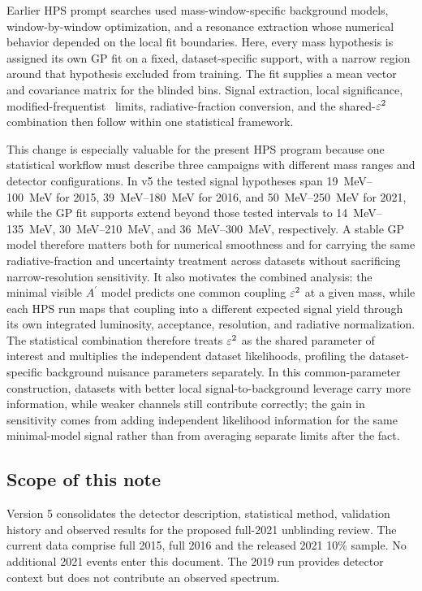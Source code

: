 Earlier HPS prompt searches used mass-window-specific background models,
window-by-window optimization, and a resonance extraction whose numerical behavior
depended on the local fit boundaries. Here, every mass hypothesis is assigned its own
GP fit on a fixed, dataset-specific support, with a narrow region around that hypothesis
excluded from training. The fit supplies a mean vector and covariance matrix for the
blinded bins. Signal extraction, local significance, modified-frequentist \CLs\ limits,
radiative-fraction conversion, and the shared-$\varepsilon^2$ combination then follow within
one statistical framework.

This change is especially valuable for the present HPS program because one statistical
workflow must describe three campaigns with different mass ranges and detector
configurations. In v5 the tested signal hypotheses span \SIrange{19}{100}{MeV} for
2015, \SIrange{39}{180}{MeV} for 2016, and \SIrange{50}{250}{MeV} for 2021, while
the GP fit supports extend beyond those tested intervals to
\SIrange{14}{135}{MeV}, \SIrange{30}{210}{MeV}, and
\SIrange{36}{300}{MeV}, respectively. A stable GP model therefore matters both for
numerical smoothness and for carrying the same radiative-fraction and uncertainty
treatment across datasets without sacrificing narrow-resolution sensitivity. It also
motivates the combined analysis:
the minimal visible $A^\prime$ model predicts one common coupling $\varepsilon^2$ at a given
mass, while each HPS run maps that coupling into a different expected signal yield
through its own integrated luminosity, acceptance, resolution, and radiative
normalization. The
statistical combination therefore treats $\varepsilon^2$ as the shared parameter of interest
and multiplies the independent dataset likelihoods, profiling the dataset-specific
background nuisance parameters separately. In this common-parameter construction,
datasets with better local signal-to-background leverage carry more information, while
weaker channels still contribute correctly; the gain in sensitivity comes from adding
independent likelihood information for the same minimal-model signal rather than from
averaging separate limits after the fact.

\subsection{Scope of this note}

Version 5 consolidates the detector description, statistical method, validation
history and observed results for the proposed full-2021 unblinding review. The
current data comprise full 2015, full 2016 and the released 2021 10\% sample.
No additional 2021 events enter this document. The 2019 run provides detector
context but does not contribute an observed spectrum.

